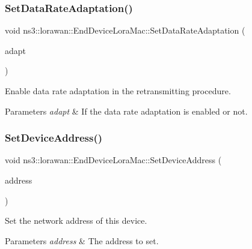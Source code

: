 \subsubsection{\texorpdfstring{Set\+Data\+Rate\+Adaptation()}{SetDataRateAdaptation()}}
{\footnotesize\ttfamily void ns3\+::lorawan\+::\+End\+Device\+Lora\+Mac\+::\+Set\+Data\+Rate\+Adaptation (\begin{DoxyParamCaption}\item[{bool}]{adapt }\end{DoxyParamCaption})}

Enable data rate adaptation in the retransmitting procedure.


\begin{DoxyParams}{Parameters}
{\em adapt} & If the data rate adaptation is enabled or not. \\
\hline
\end{DoxyParams}
\mbox{\label{classns3_1_1lorawan_1_1EndDeviceLoraMac_a304aa4040eefef152a13a8496a611404}} 
\subsubsection{\texorpdfstring{Set\+Device\+Address()}{SetDeviceAddress()}}
{\footnotesize\ttfamily void ns3\+::lorawan\+::\+End\+Device\+Lora\+Mac\+::\+Set\+Device\+Address (\begin{DoxyParamCaption}\item[{\hyperlink{classns3_1_1lorawan_1_1LoraDeviceAddress}{Lora\+Device\+Address}}]{address }\end{DoxyParamCaption})}

Set the network address of this device.


\begin{DoxyParams}{Parameters}
{\em address} & The address to set. \\
\hline
\end{DoxyParams}
\mbox{\label{classns3_1_1lorawan_1_1EndDeviceLoraMac_aad7490b330e71e9d664dd278b2c294b6}} 
